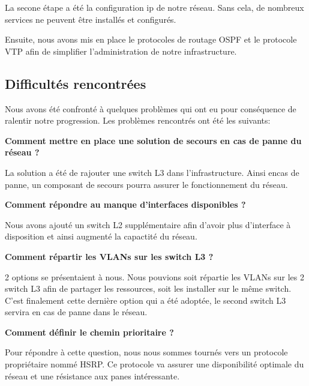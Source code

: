 \documentclass{article}
\begin{document}
        La secone étape a été la configuration ip de notre réseau. Sans cela, de nombreux services ne peuvent être installés et configurés.
        
        Ensuite, nous avons mis en place le protocoles de routage OSPF et le protocole VTP  afin de simplifier l'administration de notre infrastructure.
        
    \subsection{Difficultés rencontrées}
    
    Nous avons été confronté à quelques problèmes qui ont eu pour conséquence de ralentir notre progression. Les problèmes rencontrés ont été les suivants:
    \newline
    
    \textbf{Comment mettre en place une solution de secours en cas de panne du réseau ?} 
     \newline
    
    La solution a été de rajouter une switch L3 dans l'infrastructure. Ainsi encas de panne, un composant de secours pourra assurer le fonctionnement du réseau.
    \newline
    
     \textbf{Comment répondre au manque d'interfaces disponibles ?} 
     \newline
     
     Nous avons ajouté un switch L2 supplémentaire afin d'avoir plus d'interface à disposition et ainsi augmenté la capactité du réseau.
     \newline
     
      \textbf{Comment répartir les VLANs sur les switch L3 ?} 
     \newline
     
     2 options se présentaient à nous. Nous pouvions soit répartie les VLANs sur les 2 switch L3 afin de partager les ressources, soit les installer sur le même switch.
     C'est finalement cette dernière option qui a été adoptée, le second switch L3 servira en cas de panne dans le réseau.
      \newline
     
      \textbf{Comment définir le chemin prioritaire ?} 
     \newline
     
     Pour répondre à cette question, nous nous sommes tournés vers un protocole propriétaire nommé HSRP. Ce protocole va assurer une disponibilité optimale du réseau et une résistance aux panes intéressante.
      \newline
     
\end{document}

